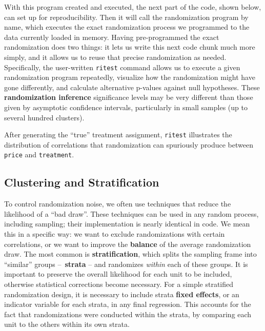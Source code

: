 
With this program created and executed,
the next part of the code, shown below,
can set up for reproducibility.
Then it will call the randomization program by name,
which executes the exact randomization process we programmed
to the data currently loaded in memory.
Having pre-programmed the exact randomization does two things:
it lets us write this next code chunk much more simply,
and it allows us to reuse that precise randomization as needed.
Specifically, the user-written \texttt{ritest} command
allows us to execute a given randomization program repeatedly,
visualize how the randomization might have gone differently,
and calculate alternative p-values against null hypotheses.
These \textbf{randomization inference} significance levels may be very different
than those given by asymptotic confidence intervals,
particularly in small samples (up to several hundred clusters).

After generating the ``true'' treatment assignment,
\texttt{ritest} illustrates the distribution of correlations
that randomization can spuriously produce
between \texttt{price} and \texttt{treatment}.


\subsection{Clustering and Stratification}

To control randomization noise, we often use techniques
that reduce the likelihood of a ``bad draw''.\cite{athey2017econometrics}
These techniques can be used in any random process,
including sampling; their implementation is nearly identical in code.
We mean this in a specific way: we want to exclude
randomizations with certain correlations,
or we want to improve the \textbf{balance}
of the average randomization draw.\cite{bruhn2009pursuit}
The most common is \textbf{stratification},
which splits the sampling frame into ``similar'' groups – \textbf{strata} –
and randomizes \textit{within} each of these groups.
It is important to preserve the overall likelihood for each unit to be included,
otherwise statistical corrections become necessary.
For a simple stratified randomization design,
it is necessary to include strata \textbf{fixed effects},
or an indicator variable for each strata, in any final regression.
This accounts for the fact that randomizations were conducted within the strata,
by comparing each unit to the others within its own strata.

